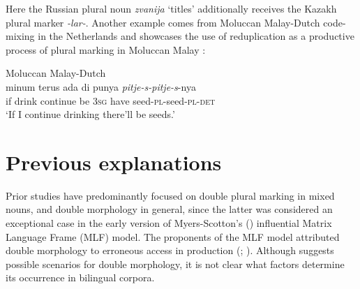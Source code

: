 \noindent Here the Russian plural noun \textit{zvanija} `titles' additionally receives the Kazakh plural marker \textit{-lar-}. Another example comes from Moluccan Malay-Dutch code-mixing in the Netherlands and showcases the use of reduplication as a productive process of plural marking in Moluccan Malay \citep[50--56]{voigt94}:

\ea
\label{ex:6:12}
Moluccan Malay-Dutch \citep[52]{voigt94}\\
 {minum} {terus} {ada} {di} {punya} \textit{pitje-s-pitje-s}-nya\\
	if drink continue be \textsc{3sg} {have} seed-\textsc{pl}-seed-\textsc{pl-det}\\
\glt `If I continue drinking there’ll be seeds.'
\z

\section{Previous explanations}\label{sec:previous explanations}

Prior studies have predominantly focused on double plural marking in mixed nouns, and double morphology in general, since the latter was considered an exceptional case in the early version of Myers-Scotton's (\citeyear{myers-scotton-duelling-1993}) influential Matrix Language Frame (MLF) model. The proponents of the MLF model attributed double morphology to erroneous access in production (\citealt[132--136]{myers-scotton-duelling-1993}; \citealt[1000]{myers-scotton-matching-1995}). Although \citet[134]{myers-scotton-duelling-1993} suggests possible scenarios for double morphology, it is not clear what factors determine its occurrence in bilingual corpora.

